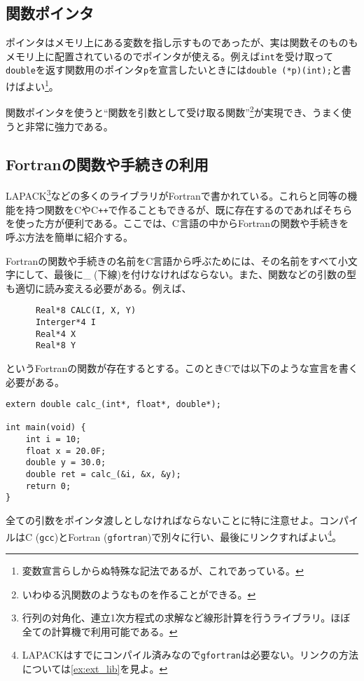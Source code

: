 \subsection{関数ポインタ}
ポインタはメモリ上にある変数を指し示すものであったが、実は関数そのものもメモリ上に配置されているのでポインタが使える。例えば\texttt{int}を受け取って\texttt{double}を返す関数用のポインタ\texttt{p}を宣言したいときには\texttt{double (*p)(int);}と書けばよい\footnote{変数宣言らしからぬ特殊な記法であるが、これであっている。}。

関数ポインタを使うと``関数を引数として受け取る関数''\footnote{いわゆる汎関数のようなものを作ることができる。}が実現でき、うまく使うと非常に強力である。

\subsection {Fortranの関数や手続きの利用}

LAPACK\footnote{行列の対角化、連立1次方程式の求解など線形計算を行うライブラリ。ほぼ全ての計算機で利用可能である。}などの多くのライブラリがFortranで書かれている。これらと同等の機能を持つ関数をCやC\texttt{++}で作ることもできるが、既に存在するのであればそちらを使った方が便利である。ここでは、C言語の中からFortranの関数や手続きを呼ぶ方法を簡単に紹介する。

Fortranの関数や手続きの名前をC言語から呼ぶためには、その名前をすべて小文字にして、最後に\_ (下線)を付けなければならない。また、関数などの引数の型も適切に読み変える必要がある。例えば、
\begin{reidai}\label{ex:fort}
    \begin{verbatim}
      Real*8 CALC(I, X, Y)
      Interger*4 I
      Real*4 X
      Real*8 Y
\end{verbatim}
\end{reidai} \noindent
というFortranの関数が存在するとする。このときCでは以下のような宣言を書く必要がある。
\begin{reidai}
    \begin{verbatim}
extern double calc_(int*, float*, double*);

int main(void) {
    int i = 10;
    float x = 20.0F;
    double y = 30.0;
    double ret = calc_(&i, &x, &y);
    return 0;
}
\end{verbatim}
\end{reidai} \noindent
全ての引数をポインタ渡しとしなければならないことに特に注意せよ。コンパイルはC (\texttt{gcc})とFortran (\texttt{gfortran})で別々に行い、最後にリンクすればよい\footnote{LAPACKはすでにコンパイル済みなので\texttt{gfortran}は必要ない。リンクの方法については\ref{ex:ext_lib}を見よ。}。

